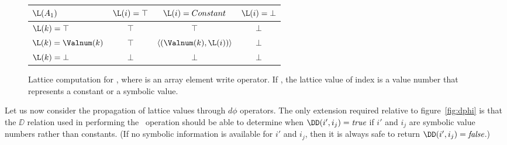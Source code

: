 \begin{figure}%
\begin{center}
\begin{tabular}{|l||c|c|c|}
\hline
$\L(A_1)$ & $\L(i) = \top$ & $\L(i) = Constant$ & $\L(i) = \bot$ \\
\hline \hline
$\L(k) = \top$ & $\top$ & $\top$ & $\bot$ \\
\hline
$\L(k) = \Valnum(k)$ & $\top$ & $\langle(\Valnum(k),\L(i))\rangle$ & $\bot$ \\
\hline
$\L(k) = \bot$ & $\bot$ & $\bot$ & $\bot$ \\
\hline
\end{tabular}
\end{center}
\caption{Lattice computation for ,
where  is an 
array element write operator. If , the lattice value of index  is a value number that represents a constant or a symbolic value.}
\label{fig:symb-adef}
\end{figure}





Let us now consider
the propagation of lattice values through $d\phi$
operators.
The only extension required  relative to figure~\ref{fig:dphi} is that
the $\DD$ relation used in performing
the \Update\ operation should be able to determine when
$\DD(i',i_j)=\mbox{\it true}$ if $i'$ and $i_j$ are symbolic
value numbers rather
than constants.  (If no symbolic information is available for $i'$
and $i_j$, then it is always safe
to return $\DD(i',i_j)=\mbox{\it false}$.)









